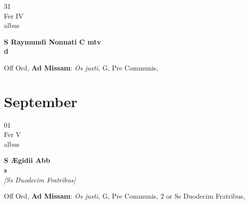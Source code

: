 \documentclass[10pt, openany]{book}
\begin{document}
        \begin{center}
            \begin{minipage}{3.5in}
                \vspace{2em}
                \begin{minipage}{0.5in}
                    {\Huge 31} \\
                    {\normalsize Fer IV} \\
                    {\normalsize albus}
                \end{minipage}
                \begin{minipage}{3.0in}
                    \textbf{ \large S Raymundi Nonnati C mtv \\
                    \textnormal{\normalsize d}} \\ 
                \end{minipage}
                \begin{justify}Off Ord, \textbf{Ad Missam}: \textit{Os justi,} G, Pre Communis,   
                \end{justify}
            \end{minipage}
        \end{center}
    
        \chapter{September}
                        
        \begin{center}
            \begin{minipage}{3.5in}
                \vspace{2em}
                \begin{minipage}{0.5in}
                    {\Huge 01} \\
                    {\normalsize Fer V} \\
                    {\normalsize albus}
                \end{minipage}
                \begin{minipage}{3.0in}
                    \textbf{ \large S Ægidii Abb \\
                    \textnormal{\normalsize s}} \\ \textit{[Ss Duodecim Fratribus]} \\ 
                \end{minipage}
                \begin{justify}Off Ord, \textbf{Ad Missam}: \textit{Os justi,} G, Pre Communis, 2 or Ss Duodecim Fratribus,   
                \end{justify}
            \end{minipage}
        \end{center}
    
\end{document}
